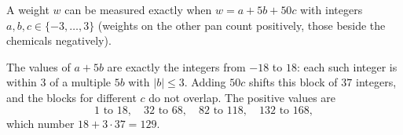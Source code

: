 A weight $w$ can be measured exactly when $w=a+5b+50c$ with integers $a,b,c\in\{-3,\dots,3\}$ (weights on the other pan count positively, those beside the chemicals negatively).

The values of $a+5b$ are exactly the integers from $-18$ to $18$: each such integer is within $3$ of a multiple $5b$ with $|b|\le3$. Adding $50c$ shifts this block of $37$ integers, and the blocks for different $c$ do not overlap. The positive values are
\[1\text{ to }18,\quad32\text{ to }68,\quad82\text{ to }118,\quad132\text{ to }168,\]
which number $18+3\cdot37=\boxed{129}$.
